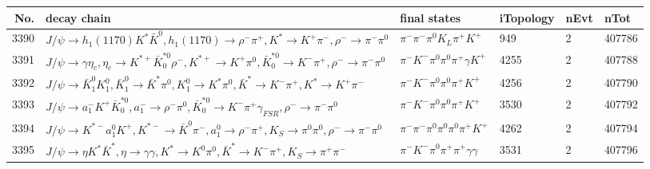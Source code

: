 \begin{table}[htbp] 
\begin{center}
\begin{small}
\begin{tabular}{rlllll}\hline\hline
 No. & decay chain & final states &  iTopology & nEvt & nTot \\\hline
3390&$J/\psi       \rightarrow h_{1}(1170)    K^{*}          \bar{K}^{0}   , h_{1}(1170)     \rightarrow \rho^{-}      \pi^{+}        , K^{*}           \rightarrow K^{+}          \pi^{-}        , \rho^{-}       \rightarrow \pi^{-}        \pi^{0}        $&$\pi^{-}        \pi^{-}        \pi^{0}        K_{L}          \pi^{+}        K^{+}          $&  949&    2&407786\\
3391&$J/\psi       \rightarrow \gamma       \eta_{c}    , \eta_{c}     \rightarrow K^{*+}         \bar{K}_0^{*0}\rho^{-}      , K^{*+}          \rightarrow K^{+}          \pi^{0}        , \bar{K}_0^{*0} \rightarrow K^{-}          \pi^{+}        , \rho^{-}       \rightarrow \pi^{-}        \pi^{0}        $&$\pi^{-}        K^{-}          \pi^{0}        \pi^{0}        \pi^{+}        \gamma       K^{+}          $& 4255&    2&407788\\
3392&$J/\psi       \rightarrow \bar{K}_1^{0} K_1^{0}        , \bar{K}_1^{0}  \rightarrow \bar{K}^{*}   \pi^{0}        , K_1^{0}         \rightarrow K^{*}          \pi^{0}        , \bar{K}^{*}    \rightarrow K^{-}          \pi^{+}        , K^{*}           \rightarrow K^{+}          \pi^{-}        $&$\pi^{-}        K^{-}          \pi^{0}        \pi^{0}        \pi^{+}        K^{+}          $& 4256&    2&407790\\
3393&$J/\psi       \rightarrow a_{1}^{-}      K^{+}          \bar{K}_0^{*0}, a_{1}^{-}       \rightarrow \rho^{-}      \pi^{0}        , \bar{K}_0^{*0} \rightarrow K^{-}          \pi^{+}        \gamma_{FSR} , \rho^{-}       \rightarrow \pi^{-}        \pi^{0}        $&$\pi^{-}        K^{-}          \pi^{0}        \pi^{0}        \pi^{+}        K^{+}          $& 3530&    2&407792\\
3394&$J/\psi       \rightarrow K^{*-}         a_{1}^{0}      K^{+}          , K^{*-}          \rightarrow \bar{K}^{0}   \pi^{-}        , a_{1}^{0}       \rightarrow \rho^{-}      \pi^{+}        , K_{S}           \rightarrow \pi^{0}        \pi^{0}        , \rho^{-}       \rightarrow \pi^{-}        \pi^{0}        $&$\pi^{-}        \pi^{-}        \pi^{0}        \pi^{0}        \pi^{0}        \pi^{+}        K^{+}          $& 4262&    2&407794\\
3395&$J/\psi       \rightarrow \eta          K^{*}          \bar{K}^{*}   , \eta           \rightarrow \gamma       \gamma       , K^{*}           \rightarrow K^{0}          \pi^{0}        , \bar{K}^{*}    \rightarrow K^{-}          \pi^{+}        , K_{S}           \rightarrow \pi^{+}        \pi^{-}        $&$\pi^{-}        K^{-}          \pi^{0}        \pi^{+}        \pi^{+}        \gamma       \gamma       $& 3531&    2&407796\\

\end{tabular}
\end{small}
\end{center}
\end{table}

